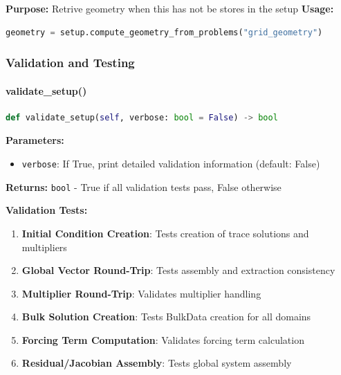 \textbf{Purpose:} Retrive geometry when this has not be stores in the setup
\textbf{Usage:}
\begin{lstlisting}[language=Python, caption=Domain Solution Extraction Usage]
geometry = setup.compute_geometry_from_problems("grid_geometry")
\end{lstlisting}




\subsubsection{Validation and Testing}

\paragraph{validate\_setup()}\leavevmode
\begin{lstlisting}[language=Python, caption=Validate Setup Method]
def validate_setup(self, verbose: bool = False) -> bool
\end{lstlisting}

\textbf{Parameters:}
\begin{itemize}
    \item \texttt{verbose}: If True, print detailed validation information (default: False)
\end{itemize}

\textbf{Returns:} \texttt{bool} - True if all validation tests pass, False otherwise

\textbf{Validation Tests:}
\begin{enumerate}
    \item \textbf{Initial Condition Creation}: Tests creation of trace solutions and multipliers
    \item \textbf{Global Vector Round-Trip}: Tests assembly and extraction consistency
    \item \textbf{Multiplier Round-Trip}: Validates multiplier handling
    \item \textbf{Bulk Solution Creation}: Tests BulkData creation for all domains
    \item \textbf{Forcing Term Computation}: Validates forcing term calculation
    \item \textbf{Residual/Jacobian Assembly}: Tests global system assembly
\end{enumerate}

